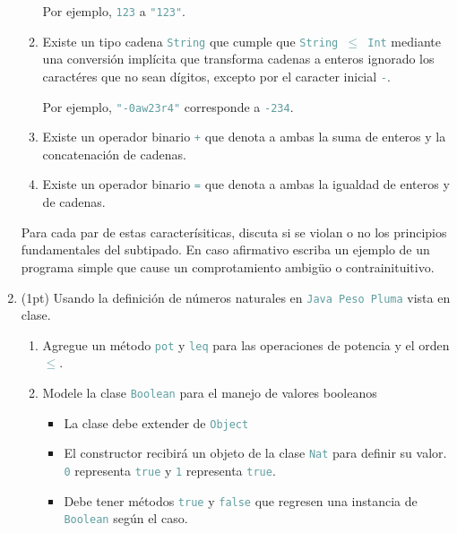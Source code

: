 \documentclass{article}
\newcommand{\tx}[1]{\textcolor{CadetBlue} {\texttt{#1}}}
\newcommand{\pt}[1]{\textcolor{RoyalPurple}{(#1pt)}}
\begin{document}
\begin{enumerate}
\begin{enumerate}
            Por ejemplo, \tx{123} a \tx{"123"}.

            \item Existe un tipo cadena \tx{String} que cumple que 
            \tx{String $\leq$ Int} mediante una conversión implícita que 
            transforma cadenas a enteros ignorado los caractéres que no sean
            dígitos, excepto por el caracter inicial \tx{-}.

            Por ejemplo, \tx{"}\tx{-0aw23r4"} corresponde a \tx{-234}.

            \item Existe un operador binario \tx{+} que denota a ambas la suma 
            de enteros y la concatenación de cadenas.

            \item Existe un operador binario \tx{=} que denota a ambas la 
            igualdad de enteros y de cadenas.
        \end{enumerate}

        Para cada par de estas caracterísiticas, discuta si se violan o no los 
        principios fundamentales del subtipado. En caso afirmativo escriba un
        ejemplo de un programa simple que cause un comprotamiento ambigüo o 
        contrainituitivo.

        \item \pt{1} Usando la definición de números naturales en 
        \tx{Java Peso Pluma} vista en clase.

        \begin{enumerate}
            \item Agregue un método \tx{pot} y \tx{leq} para las operaciones de
            potencia y el orden \tx{$\leq$}.

            \item Modele la clase \tx{Boolean} para el manejo de valores
            booleanos
            \begin{itemize}
                \item La clase debe extender de \tx{Object}

                \item El constructor recibirá un objeto de la clase \tx{Nat}
                para definir su valor. \tx{0} representa \tx{true} y \tx{1}
                representa \tx{true}.

                \item Debe tener métodos \tx{true} y \tx{false} que regresen una
                instancia de \tx{Boolean} según el caso.
            \end{itemize} 
        \end{enumerate}
        

\end{enumerate}
\end{document}
